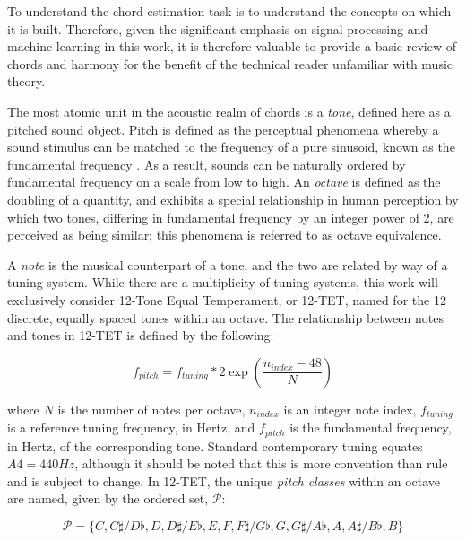 To understand the chord estimation task is to understand the concepts on which it is built.
Therefore, given the significant emphasis on signal processing and machine learning in this work, it is therefore valuable to provide a basic review of chords and harmony for the benefit of the technical reader unfamiliar with music theory.

The most atomic unit in the acoustic realm of chords is a \emph{tone}, defined here as a pitched sound object.
Pitch is defined as the perceptual phenomena whereby a sound stimulus can be matched to the frequency of a pure sinusoid, known as the fundamental frequency \cite{Krumhansl1979Psychological}.
As a result, sounds can be naturally ordered by fundamental frequency on a scale from low to high.
An \emph{octave} is defined as the doubling of a quantity, and exhibits a special relationship in human perception by which two tones, differing in fundamental frequency by an integer power of 2, are perceived as being similar; this phenomena is referred to as octave equivalence.

A \emph{note} is the musical counterpart of a tone, and the two are related by way of a tuning system.
While there are a multiplicity of tuning systems, this work will exclusively consider 12-Tone Equal Temperament, or 12-TET, named for the 12 discrete, equally spaced tones within an octave.
The relationship between notes and tones in 12-TET is defined by the following:

\begin{equation}
\label{eq:tuning}
f_{pitch} = f_{tuning} * 2 \exp(\frac{n_{index} - 48}{N})
\end{equation}

\noindent where $N$ is the number of notes per octave, $n_{index}$ is an integer note index, $f_{tuning}$ is a reference tuning frequency, in Hertz, and $f_{pitch}$ is the fundamental frequency, in Hertz, of the corresponding tone.
Standard contemporary tuning equates $A4=440Hz$, although it should be noted that this is more convention than rule and is subject to change.
In 12-TET, the unique \emph{pitch classes} within an octave are named, given by the ordered set, $\mathcal{P}$:

\begin{equation}
\label{eq:pitch_classes}
\mathcal{P} = \{C, C\sharp / D\flat, D, D\sharp / E\flat, E, F, F\sharp / G\flat, G, G\sharp / A\flat, A, A\sharp / B\flat, B\}
\end{equation}

